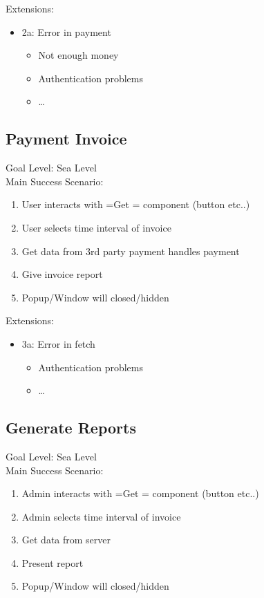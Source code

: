 \documentclass[11pt]{article}
\begin{document}
Extensions:
\begin{itemize}
\item 2a: Error in payment
\begin{itemize}
\item Not enough money
\item Authentication problems
\item \ldots{}
\end{itemize}
\end{itemize}
\subsection{Payment Invoice}
\label{sec:org787b418}
Goal Level: Sea Level \\
Main Success Scenario: \\

\begin{enumerate}
\item User interacts with =Get = component (button etc..)
\item User selects time interval of invoice
\item Get data from 3rd party payment handles payment
\item Give invoice report
\item Popup/Window will closed/hidden
\end{enumerate}

Extensions:  \\
\begin{itemize}
\item 3a: Error in fetch
\begin{itemize}
\item Authentication problems
\item \ldots{}
\end{itemize}
\end{itemize}
\subsection{Generate Reports}
\label{sec:orga18ad24}
Goal Level: Sea Level \\
Main Success Scenario: \\

\begin{enumerate}
\item Admin interacts with =Get = component (button etc..)
\item Admin selects time interval of invoice
\item Get data from server
\item Present report
\item Popup/Window will closed/hidden
\end{enumerate}
\end{document}
